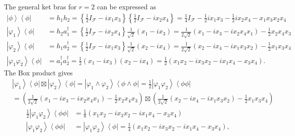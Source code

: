 \documentclass[aps,preprint]{revtex4}%
\begin{document}
The general ket bras for $r=2$ can be expressed as
\begin{align}
\left\vert \phi\right\rangle \left\langle \phi\right\vert  &  =h_{1}%
h_{2}=\left\{  \frac{1}{2}I_{\mathcal{F}}-ix_{1}x_{3}\right\}  \left\{
\frac{1}{2}I_{\mathcal{F}}-ix_{2}x_{4}\right\}  =\frac{1}{4}I_{\mathcal{F}%
}-\frac{1}{2}ix_{1}x_{3}-\frac{1}{2}ix_{2}x_{4}-x_{1}x_{3}x_{2}x_{4}\\
\left\vert \varphi_{1}\right\rangle \left\langle \phi\right\vert  &
=h_{2}a_{1}^{\dagger}=\left\{  \frac{1}{2}I_{\mathcal{F}}-ix_{2}x_{4}\right\}
\frac{1}{\sqrt{2}}\left(  x_{1}-ix_{3}\right)  =\frac{1}{2\sqrt{2}}\left(
x_{1}-ix_{3}-ix_{2}x_{4}x_{1}\right)  -\frac{1}{2}x_{2}x_{4}x_{3}\\
\left\vert \varphi_{2}\right\rangle \left\langle \phi\right\vert  &
=h_{1}a_{2}^{\dagger}=\left\{  \frac{1}{2}I_{\mathcal{F}}-ix_{1}x_{3}\right\}
\frac{1}{\sqrt{2}}\left(  x_{2}-ix_{4}\right)  =\frac{1}{2\sqrt{2}}\left(
x_{2}-ix_{4}-ix_{1}x_{3}x_{2}\right)  -\frac{1}{2}x_{1}x_{3}x_{4}\\
\left\vert \varphi_{1}\varphi_{2}\right\rangle \left\langle \phi\right\vert
&  =a_{1}^{\dagger}a_{2}^{\dagger}=\frac{1}{2}\left(  x_{1}-ix_{3}\right)
\left(  x_{2}-ix_{4}\right)  =\frac{1}{2}\left(  x_{1}x_{2}-ix_{3}x_{2}%
-ix_{1}x_{4}-x_{3}x_{4}\right)  .
\end{align}
The Box product gives
\begin{align}
&  \left\vert \varphi_{1}\right\rangle \left\langle \phi\right\vert
\boxtimes\left\vert \varphi_{2}\right\rangle \left\langle \phi\right\vert
=\left\vert \varphi_{1}\wedge\varphi_{2}\right\rangle \left\langle \phi
\wedge\phi\right\vert =\frac{1}{2}\left\vert \varphi_{1}\varphi_{2}%
\right\rangle \left\langle \phi\phi\right\vert \\
&  =\left(  \frac{1}{2\sqrt{2}}\left(  x_{1}-ix_{3}-ix_{2}x_{4}x_{1}\right)
-\frac{1}{2}x_{2}x_{4}x_{3}\right)  \boxtimes\left(  \frac{1}{2\sqrt{2}%
}\left(  x_{2}-ix_{4}-ix_{1}x_{3}x_{2}\right)  -\frac{1}{2}x_{1}x_{3}%
x_{4}\right)
\end{align}%
\begin{align}
\frac{1}{2}\left\vert \varphi_{1}\varphi_{2}\right\rangle \left\langle
\phi\phi\right\vert  &  =\frac{1}{8}\left(  x_{1}x_{2}-ix_{3}x_{2}-ix_{1}%
x_{4}-x_{3}x_{4}\right)  \\
\left\vert \varphi_{1}\varphi_{2}\right\rangle \left\langle \phi
\phi\right\vert  &  =\left\vert \varphi_{1}\varphi_{2}\right\rangle
\left\langle \phi\right\vert =\frac{1}{4}\left(  x_{1}x_{2}-ix_{3}x_{2}%
-ix_{1}x_{4}-x_{3}x_{4}\right)  ,
\end{align}
\end{document}
